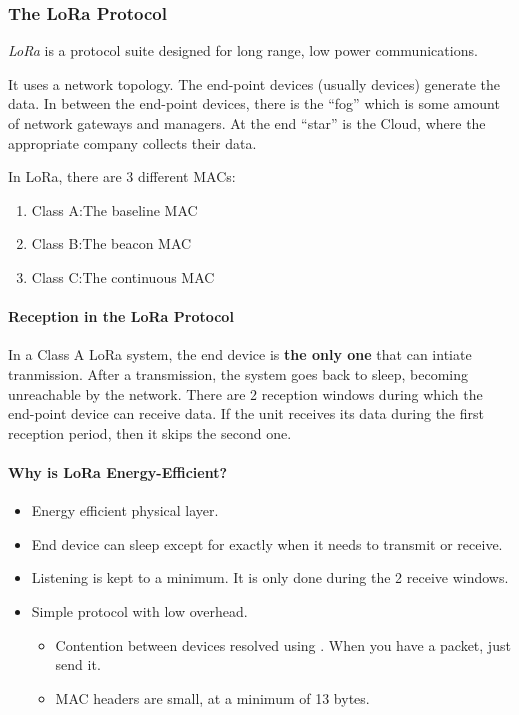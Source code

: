 \subsubsection{The LoRa Protocol}\label{subsubsec:LoRa_Protocol}
\begin{definition}[LoRa]\label{def:LoRa}
  \emph{LoRa} is a protocol suite designed for long range, low power communications.

  It uses a  network topology.
  The end-point devices (usually  devices) generate the data.
  In between the end-point devices, there is the ``fog'' which is some amount of network gateways and managers.
  At the end ``star'' is the Cloud, where the appropriate company collects their data.
\end{definition}

In LoRa, there are 3 different MACs:
\begin{enumerate}[noitemsep]
\item Class A:\@ The baseline MAC
\item Class B:\@ The beacon MAC
\item Class C:\@ The continuous MAC
\end{enumerate}

\paragraph{Reception in the LoRa Protocol}\label{par:LoRa_Reception}
In a Class A LoRa system, the end device is \textbf{the only one} that can intiate tranmission.
After a transmission, the system goes back to sleep, becoming unreachable by the network.
There are 2 reception windows during which the end-point device can receive data.
If the unit receives its data during the first reception period, then it skips the second one.

\paragraph{Why is LoRa Energy-Efficient?}\label{par:Why_LoRa_Energy_Efficient}
\begin{itemize}[noitemsep]
\item Energy efficient physical layer.
\item End device can sleep except for exactly when it needs to transmit or receive.
\item Listening is kept to a minimum. It is only done during the 2 receive windows.
\item Simple protocol with low overhead.
  \begin{itemize}[noitemsep]
  \item Contention between devices resolved using . When you have a packet, just send it.
  \item MAC headers are small, at a minimum of 13 bytes.
  \end{itemize}
\end{itemize}

